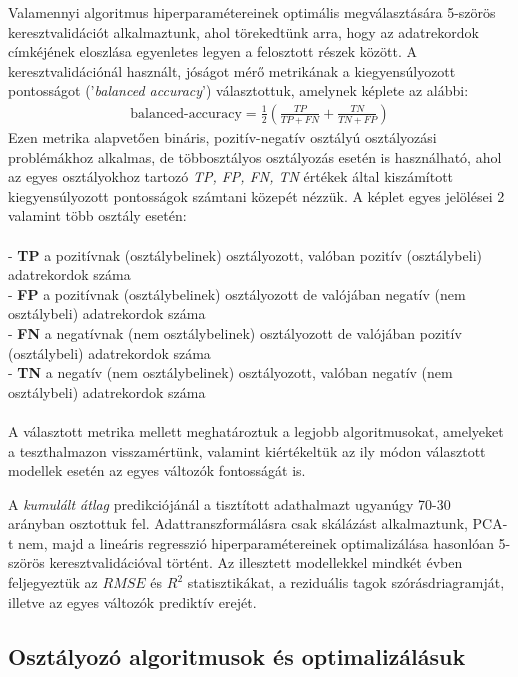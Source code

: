 \documentclass[12pt]{article}
\begin{document}
Valamennyi algoritmus hiperparamétereinek optimális megválasztására 5-szörös keresztvalidációt alkalmaztunk, ahol törekedtünk arra, hogy az adatrekordok címkéjének eloszlása egyenletes legyen a felosztott részek között. A keresztvalidációnál használt, jóságot mérő metrikának a kiegyensúlyozott pontosságot ('\textit{balanced accuracy}') választottuk, amelynek képlete az alábbi:
\begin{align*}
\text{balanced-accuracy} = \frac{1}{2}\left(\frac{TP}{TP+FN} + \frac{TN}{TN+FP} \right) 
\end{align*}Ezen metrika alapvetően bináris, pozitív-negatív osztályú osztályozási problémákhoz alkalmas, de többosztályos osztályozás esetén is használható, ahol az egyes osztályokhoz tartozó \textit{TP, FP, FN, TN} értékek által kiszámított kiegyensúlyozott pontosságok számtani közepét nézzük. A képlet egyes jelölései 2 valamint több osztály esetén:  \\ \\
- \textbf{TP} a pozitívnak (osztálybelinek) osztályozott, valóban pozitív (osztálybeli) adatrekordok száma \\
- \textbf{FP} a pozitívnak (osztálybelinek) osztályozott de valójában negatív (nem osztálybeli) adatrekordok száma \\
- \textbf{FN} a negatívnak (nem osztálybelinek) osztályozott de valójában pozitív (osztálybeli) adatrekordok száma \\
- \textbf{TN} a negatív (nem osztálybelinek) osztályozott, valóban negatív (nem osztálybeli) adatrekordok száma \\ 
\\
A választott metrika mellett meghatároztuk a legjobb algoritmusokat, amelyeket a teszthalmazon visszamértünk, valamint kiértékeltük az ily módon választott modellek esetén az egyes változók fontosságát is.

A \textit{kumulált átlag} predikciójánál a tisztított adathalmazt ugyanúgy 70-30 arányban osztottuk fel. Adattranszformálásra csak skálázást alkalmaztunk, PCA-t nem, majd a lineáris regresszió hiperparamétereinek optimalizálása hasonlóan 5-szörös keresztvalidációval történt. Az illesztett modellekkel mindkét évben feljegyeztük az $RMSE$ és $R^2$ statisztikákat, a reziduális tagok szórásdriagramját, illetve az egyes változók prediktív erejét.






\subsection{Osztályozó algoritmusok és optimalizálásuk}
\end{document}
